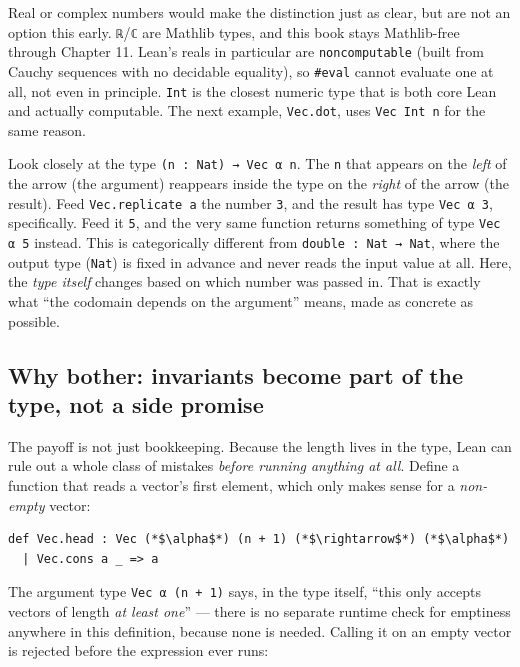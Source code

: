Real or complex numbers would make the distinction just as clear, but are not an option this early. \texttt{ℝ}/\texttt{ℂ} are Mathlib types, and this book stays Mathlib-free through Chapter 11. Lean's reals in particular are \texttt{noncomputable} (built from Cauchy sequences with no decidable equality), so \texttt{\#eval} cannot evaluate one at all, not even in principle. \texttt{Int} is the closest numeric type that is both core Lean and actually computable. The next example, \texttt{Vec.dot}, uses \texttt{Vec Int n} for the same reason.

Look closely at the type \texttt{(n : Nat) → Vec α n}. The \texttt{n} that appears on the \emph{left} of the arrow (the argument) reappears inside the type on the \emph{right} of the arrow (the result). Feed \texttt{Vec.replicate a} the number \texttt{3}, and the result has type \texttt{Vec α 3}, specifically. Feed it \texttt{5}, and the very same function returns something of type \texttt{Vec α 5} instead. This is categorically different from \texttt{double : Nat → Nat}, where the output type (\texttt{Nat}) is fixed in advance and never reads the input value at all. Here, the \emph{type itself} changes based on which number was passed in. That is exactly what ``the codomain depends on the argument'' means, made as concrete as possible.

\subsection{Why bother: invariants become part of the type, not a side promise}\label{sec:01-basics:03-dependent-types:6}

The payoff is not just bookkeeping. Because the length lives in the type, Lean can rule out a whole class of mistakes \emph{before running anything at all}. Define a function that reads a vector's first element, which only makes sense for a \emph{non-empty} vector:

\begin{lstlisting}
def Vec.head : Vec (*$\alpha$*) (n + 1) (*$\rightarrow$*) (*$\alpha$*)
  | Vec.cons a _ => a
\end{lstlisting}

The argument type \texttt{Vec α (n + 1)} says, in the type itself, ``this only accepts vectors of length \emph{at least one}'' --- there is no separate runtime check for emptiness anywhere in this definition, because none is needed. Calling it on an empty vector is rejected before the expression ever runs:

